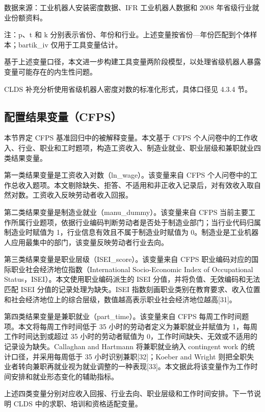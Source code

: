 \documentclass[UTF8, zihao=-4, a4paper, openany, fontset=none]{ctexrep}
\numberwithin{equation}{chapter}
\begin{document}
数据来源：工业机器人安装密度数据、IFR 工业机器人数据和 2008 年省级行业就业份额资料。

注：p、t 和 k 分别表示省份、年份和行业。上述变量按省份---年份匹配到个体样本；bartik\_iv 仅用于工具变量估计。

基于上述变量口径，本文进一步构建工具变量两阶段模型，以处理省级机器人暴露变量可能存在的内生性问题。

CLDS 补充分析使用省级机器人密度对数的标准化形式，具体口径见 4.3.4 节。

\subsection{配置结果变量（CFPS）}\label{ux914dux7f6eux7ed3ux679cux53d8ux91cfcfps}

本节界定 CFPS 基准回归中的被解释变量。本文基于 CFPS 个人问卷中的工作收入、行业、职业和工时题项，构造工资收入、制造业就业、职业层级和兼职就业四类结果变量。

第一类结果变量是工资收入对数（ln\_wage）。该变量来自 CFPS 个人问卷中的工作总收入题项。本文剔除缺失、拒答、不适用和非正收入记录后，对有效收入取自然对数。工资收入反映劳动者收入回报。

第二类结果变量是制造业就业（manu\_dummy）。该变量来自 CFPS 当前主要工作所属行业题项，依据行业编码判断劳动者是否处于制造业部门；当行业代码归属制造业时赋值为 1，行业信息有效且不属于制造业时赋值为 0。制造业是工业机器人应用最集中的部门，该变量反映劳动者行业去向。

第三类结果变量是职业层级（ISEI\_score）。该变量来自 CFPS 职业编码对应的国际职业社会经济地位指数（International Socio-Economic Index of Occupational Status，ISEI）。本文使用职业编码派生的 ISEI 分值，并将负值、无效编码和无法匹配 ISEI 分值的记录处理为缺失。ISEI 指数刻画职业类别在教育要求、收入位置和社会经济地位上的综合层级，数值越高表示职业社会经济地位越高{[}31{]}。

第四类结果变量是兼职就业（part\_time）。该变量来自 CFPS 每周工作时间题项。本文将每周工作时间低于 35 小时的劳动者定义为兼职就业并赋值为 1，每周工作时间达到或超过 35 小时的劳动者赋值为 0，工作时间缺失、无效或不适用的记录设为缺失。Callaghan and Hartmann 将兼职就业纳入 contingent work 的统计口径，并采用每周低于 35 小时识别兼职{[}32{]}；Koeber and Wright 则把全职失业者转向兼职再就业视为就业调整的一种表现{[}33{]}。本文据此将该变量作为工作时间安排和就业形态变化的辅助指标。

上述四类变量分别对应收入回报、行业去向、职业层级和工作时间安排。下一节说明 CLDS 中的求职、培训和资格适配变量。
\end{document}
